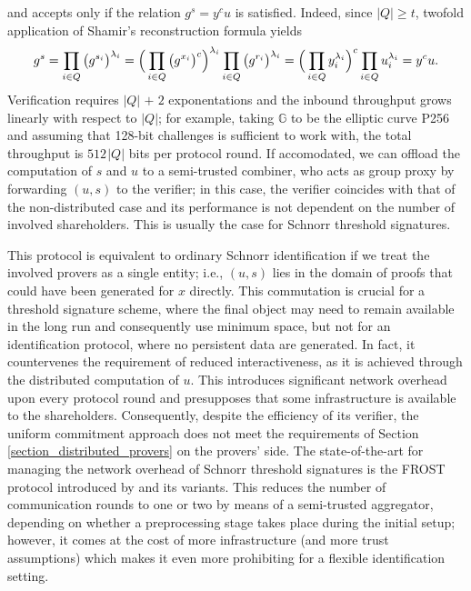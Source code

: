 \documentclass{iacrtrans}
\begin{document}
and accepts only if the relation
$g ^ s = y ^ c u$ is satisfied.
Indeed, since $|Q| \ge t$,
twofold application of Shamir's reconstruction formula yields
\vspace{5pt}
\begin{equation*}
g ^ s =
\prod_{i \in Q} \big(g ^ {s_i}\big)^{\lambda_i} =
\Big(\prod_{i \in Q}\big(g ^ {x_i}\big)^c\Big)^{\lambda_i} \prod_{i \in Q}\big(g ^ {r_i}\big) ^ {\lambda_i} =
\Big(\prod_{i \in Q}y_i^{\lambda_i}\Big)^c \prod_{i \in Q}u_i^{\lambda_i}=
y^c u.
\vspace{5pt}
\end{equation*}
Verification requires $|Q|\hspace{1pt} +\hspace{1pt} 2$
exponentations
and the inbound throughput grows linearly
with respect to $|Q|$; for example,
taking $\mathbb{G}$ to be the elliptic curve P256
and assuming that 128-bit challenges is sufficient to work with,
the total throughput is $512 \hspace{1pt} |Q|$ bits per protocol
round. If accomodated, we can offload the computation of $s$ and $u$
to a semi-trusted combiner,
who acts as group proxy by forwarding $(u, s)$ to the verifier;
in this case, the verifier coincides with that of the
non-distributed case and its performance
is not dependent on the number of involved shareholders.
This is usually the case for Schnorr threshold signatures.

This protocol is equivalent to ordinary Schnorr identification
if we treat the involved provers as a single entity;
i.e., $(u, s)$ lies in the domain
of proofs that could have been generated
for $x$ directly.
This commutation is crucial for
a threshold signature scheme,
where the final object may need to
remain available in the long run
and consequently use minimum space,
but not for an identification protocol,
where no persistent data are generated.
In fact, it countervenes the requirement
of reduced interactiveness, as it is achieved through
the distributed computation of $u$.
This introduces significant
network overhead upon every protocol round and
presupposes that some infrastructure is available
to the shareholders.
Consequently, despite the efficiency of its verifier,
the uniform commitment approach does not meet the requirements
of Section \ref{section_distributed_provers} on the provers' side.
The state-of-the-art for managing the network overhead
of Schnorr threshold signatures
is the FROST protocol introduced by \cite{paper_frost}
and its variants.
This reduces the number of communication rounds
to one or two by means of a semi-trusted aggregator,
depending on whether
a preprocessing stage takes place during the initial setup;
however, it comes at the cost of more
infrastructure (and more trust assumptions)
which makes it even more
prohibiting for a flexible identification setting.
\end{document}
